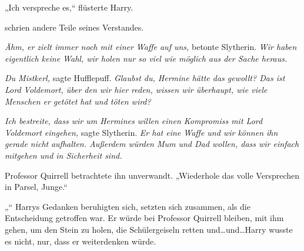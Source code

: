 „Ich verspreche es,“ flüsterte Harry.

\emph{} schrien andere Teile seines Verstandes.

\emph{Ähm, er zielt immer noch mit einer Waffe auf uns,} betonte Slytherin. \emph{Wir haben eigentlich keine Wahl, wir holen nur so viel wie möglich aus der Sache heraus.}

\emph{Du Mistkerl,} sagte Hufflepuff. \emph{Glaubst du, Hermine hätte das gewollt? Das ist Lord Voldemort, über den wir hier reden, wissen wir überhaupt, wie viele Menschen er getötet hat und töten wird?}

\emph{Ich bestreite, dass wir um Hermines willen einen Kompromiss mit Lord Voldemort eingehen,} sagte Slytherin. \emph{Er hat eine Waffe und wir können ihn gerade nicht} \emph{aufhalten. Außerdem würden Mum und Dad wollen, dass wir einfach mitgehen und in Sicherheit sind.}

Professor Quirrell betrachtete ihn unverwandt.
„Wiederhole das volle Versprechen in Parsel, Junge.“

„“
Harrys Gedanken beruhigten sich, setzten sich zusammen, als die Entscheidung getroffen war. Er würde bei Professor Quirrell bleiben, mit ihm gehen, um den Stein zu holen, die Schülergeiseln retten und…und…Harry wusste es nicht, nur, dass er weiterdenken würde.

